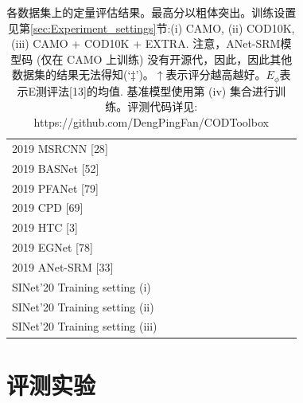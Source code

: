 \documentclass[final]{cvpr}
\renewcommand{\secref}[1]{第\ref{#1}节}
\begin{document}
\begin{table}[pb]
{\begin{tabular}{l|llll||llll||llll}
        2019 MSRCNN {[}28{]}            &       &       &       &       &       &       &       &       &       &       &       &       \\
        2019 BASNet {[}52{]}            &       &       &       &       &       &       &       &       &       &       &       &       \\
        2019 PFANet {[}79{]}            &       &       &       &       &       &       &       &       &       &       &       &       \\
        2019 CPD {[}69{]}               &       &       &       &       &       &       &       &       &       &       &       &       \\
        2019 HTC {[}3{]}                &       &       &       &       &       &       &       &       &       &       &       &       \\
        2019 EGNet {[}78{]}             &       &       &       &       &       &       &       &       &       &       &       &       \\
        2019 ANet-SRM {[}33{]}          &       &       &       &       &       &       &       &       &       &       &       &       \\ \hline
        SINet’20 Training setting (i)   &       &       &       &       &       &       &       &       &       &       &       &       \\
        SINet’20 Training setting (ii)  &       &       &       &       &       &       &       &       &       &       &       &       \\
        SINet’20 Training setting (iii) &       &       &       &       &       &       &       &       &       &       &       &       \\ \hline
        \end{tabular}
    }
    \caption{各数据集上的定量评估结果。最高分以粗体突出。训练设置见\secref{sec:Experiment_settings}:(i) CAMO, (ii) COD10K, (iii) CAMO + COD10K + EXTRA. 注意，ANet-SRM模型码 (仅在 CAMO 上训练) 没有开源代，因此，因此其他数据集的结果无法得知(‘‡’)。$\uparrow$表示评分越高越好。$E_{\phi }$表示E测评法[13]的均值. 基准模型使用第 (iv) 集合进行训练。评测代码详见: https://github.com/DengPingFan/CODToolbox}
    \label{tab:results}
\end{table}
\section{评测实验}\label{sec:Experiment}
\end{document}
